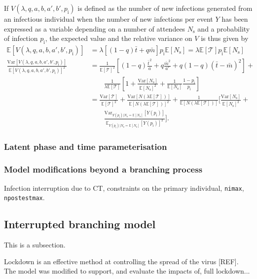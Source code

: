 \documentclass[sr]{drdc-report}
\def\mbar{\ensuremath{{}\bar{m}}}
\def\tbar{\ensuremath{{}\bar{t}}}
\newcommand{\Tau}{\mathcal{T}}
\newcommand{\pinf}{\ensuremath{{p_\mathrm{i}}}}
\newcommand{\Ns}{\ensuremath{{N_\mathrm{s}}}}
\newcommand{\ex}[1]{\mathbb{E}\left[#1\right]}
\newcommand{\exon}[2]{\mathbb{E}_{#1}\left[#2\right]}
\newcommand{\var}[1]{\mathrm{Var}\left[#1\right]}
\newcommand{\varon}[2]{\mathrm{Var}_{#1}\left[#2\right]}
\begin{document}
If $V(\lambda,q,a,b,a',b',\pinf)$ is defined as the number of new infections generated from an infectious individual when the number of new infections per event $Y$ has been expressed as a variable depending on a number of attendees $\Ns$ and a probability of infection $\pinf$, the expected value and the relative variance on $V$ is thus given by
\begin{align}
\ex{V(\lambda,q,a,b,a',b',\pinf)} & = \lambda\left[(1-q)\tbar+q\mbar\right]\pinf\ex{\Ns} = \lambda\ex{\Tau}\pinf\ex{\Ns}\label{exv}\\
\frac{\var{V(\lambda,q,a,b,a',b',\pinf)}}{\ex{V(\lambda,q,a,b,a',b',\pinf)}^2} & = \frac{1}{\ex{\Tau}^2}\left[(1-q)\frac{{\tbar\hspace{1pt}}^2}{a} + q\frac{{\mbar}^2}{a'}+q(1-q)(\tbar-\mbar)^2\right]+\nonumber\\
& \qquad\frac{1}{\lambda\ex{\Tau}}\left[1+\frac{\var{\Ns}}{\ex{\Ns}^2}+\frac{1}{\ex{\Ns}}\frac{1-\pinf}{\pinf}\right]\label{varv}\\
& = \frac{\var{\Tau}}{\ex{\Tau}^2} + \frac{\var{N(\lambda\ex{\Tau}\hspace{1pt})}}{\ex{N(\lambda\ex{\Tau}\hspace{1pt})}^2} + \frac{1}{\ex{N(\lambda\ex{\Tau}\hspace{1pt})}}\Bigg[\frac{\var{\Ns}}{\ex{\Ns}^2}+\nonumber\\
& \qquad\frac{\varon{Y(\pinf)|\Ns=\ex{\Ns}}{Y(\pinf)}}{\exon{Y(\pinf)|\Ns=\ex{\Ns}}{Y(\pinf)}^2}\Bigg].\label{varwv}
\end{align}


\subsubsection{Latent phase and time parameterisation}

\subsubsection{Model modifications beyond a branching process}
Infection interruption due to CT, constraints on the primary individual, \texttt{nimax}, \texttt{npostestmax}.

\subsection{Interrupted branching model}
This is a subsection.

Lockdown is an effective method at controlling the spread of the virus [REF]. The model was modified to support, and evaluate the impacts of, full lockdown... 
\end{document}
